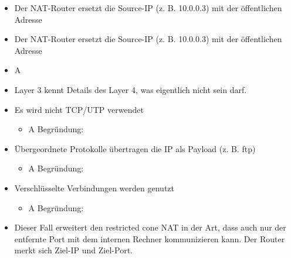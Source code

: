 \begin{itemize}
    \item Der NAT-Router ersetzt die Source-IP (z. B. 10.0.0.3) mit der öffentlichen Adresse
\end{itemize}

\begin{itemize}
    \item Der NAT-Router ersetzt die Source-IP (z. B. 10.0.0.3) mit der öffentlichen Adresse
\end{itemize}

\begin{itemize}
    \item \todo A
\end{itemize}

\begin{itemize}
    \item Layer 3 kennt Details des Layer 4, was eigentlich nicht sein darf.
\end{itemize}

\begin{itemize}
    \item Es wird nicht TCP/UTP verwendet
    \begin{itemize}
        \item \todo A Begründung:
    \end{itemize}
    \item Übergeordnete Protokolle übertragen die IP als Payload (z. B. ftp)
    \begin{itemize}
        \item \todo A Begründung:
    \end{itemize}
    \item Verschlüsselte Verbindungen werden genutzt
    \begin{itemize}
        \item \todo A Begründung:
    \end{itemize}
\end{itemize}

\begin{itemize}
    \item Dieser Fall erweitert den restricted cone NAT in der Art, dass auch nur der entfernte Port mit dem internen Rechner kommunizieren kann. Der Router merkt sich Ziel-IP und Ziel-Port.
\end{itemize}